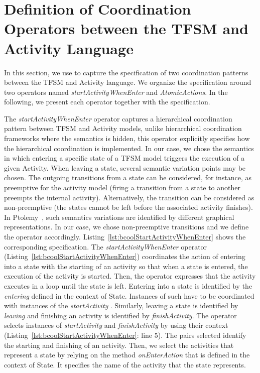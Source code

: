 \section{Definition of Coordination Operators between the TFSM and Activity Language}
In this section, we use \bcool to capture the specification of two coordination patterns between the TFSM and Activity language. We organize the specification around two operators named  \emph{startActivityWhenEnter} and \emph{AtomicActions}. In the following, we present each operator together with the \bcool specification.

The \emph{startActivityWhenEnter} operator captures a hierarchical coordination pattern between TFSM and Activity models, unlike hierarchical coordination frameworks where the semantics is hidden, this operator explicitly specifies how the hierarchical coordination is implemented. In our case, we chose the semantics in which entering a specific state of a TFSM model triggers the execution of a given Activity. When leaving a state, several semantic variation points may be chosen. The outgoing transitions from a state can be considered, for instance, as preemptive for the activity model (\ie firing a transition from a state to another preempts the internal activity). Alternatively, the transition can be considered as non-preemptive (\ie the states cannot be left before the associated activity finishes). In Ptolemy~\cite{modalsptolemybib}, such semantics variations are identified by different graphical representations. In our case, we chose non-preemptive transitions and we define the operator accordingly. Listing~\ref{lst:bcoolStartActivityWhenEnter} shows the corresponding \bcool specification. The \emph{startActivityWhenEnter} operator (Listing~\ref{lst:bcoolStartActivityWhenEnter}) coordinates the action of entering into a state with the starting of an activity so that when a state is entered, the execution of the activity is started. Then, the operator expresses that the activity executes in a loop until the state is left. Entering into a state is identified by the \textit{entering} \dse defined in the context of State. Instances of such \dse have to be coordinated with instances of the \textit{startActivity} \dse. Similarly, leaving a state is identified by \dse \textit{leaving} and finishing an activity is identified by \dse \textit{finishActivity}. The operator selects instances of \dse \emph{startActivity} and \emph{finishActivity} by using their context (Listing~\ref{lst:bcoolStartActivityWhenEnter}: line 5). The pairs selected identify the starting and finishing of an activity. Then, we select the activities that represent a state by relying on the method \emph{onEnterAction} that is defined in the context of State. It specifies the name of the activity that the state represents. 

